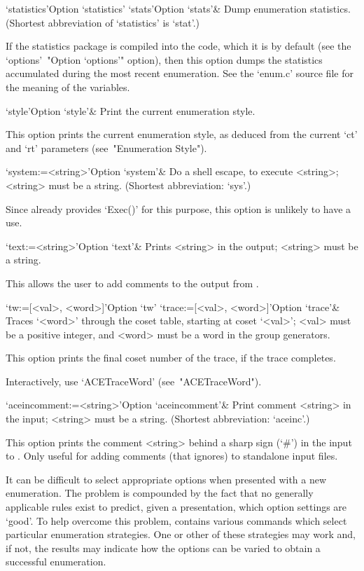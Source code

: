 \>`statistics'{Option `statistics'}
\>`stats'{Option `stats'}&
Dump enumeration statistics.
(Shortest abbreviation of `statistics' is `stat'.)

If the statistics package is compiled into the {\ACE} code,  which  it
is by default (see the `options'~"Option `options'" option), then this
option  dumps  the  statistics  accumulated  during  the  most  recent
enumeration. See the `enum.c' source  file  for  the  meaning  of  the
variables.

\>`style'{Option `style'}&
Print the current enumeration style.

This option prints the current enumeration style, as deduced from  the
current `ct' and `rt' parameters (see~"Enumeration Style").

\>`system:=<string>'{Option `system'}&
Do a shell escape, to execute <string>; <string> must be a string.
(Shortest abbreviation: `sys'.)

Since {\GAP} already provides `Exec()' for this purpose,  this  option
is unlikely to have a use.

\>`text:=<string>'{Option `text'}&
Prints <string> in the output; <string> must be a string.

This allows the user to add comments to the output from {\ACE}.

\>`tw:=[<val>, <word>]'{Option `tw'}
\>`trace:=[<val>, <word>]'{Option `trace'}&
Traces `<word>' through the coset table, starting  at  coset  `<val>';
<val> must be a positive integer, and <word> must be  a  word  in  the
group generators.

This option prints the final coset number of the trace, if  the  trace
completes.

Interactively, use `ACETraceWord' (see~"ACETraceWord").

\>`aceincomment:=<string>'{Option `aceincomment'}&
Print comment <string> in the {\ACE} input; <string> must be a string.
(Shortest abbreviation: `aceinc'.)

This option prints the comment <string> behind a sharp sign (`\#')  in
the input to {\ACE}. Only useful  for  adding  comments  (that  {\ACE}
ignores) to standalone input files.

\enditems


It can be difficult to select appropriate options when presented  with
a new enumeration. The problem is  compounded  by  the  fact  that  no
generally applicable rules exist to  predict,  given  a  presentation,
which option settings are \lq{}good'. To help overcome  this  problem,
{\ACE} contains various commands which select  particular  enumeration
strategies. One or other of these strategies may work and, if not, the
results may indicate how  the  options  can  be  varied  to  obtain  a
successful enumeration. 

